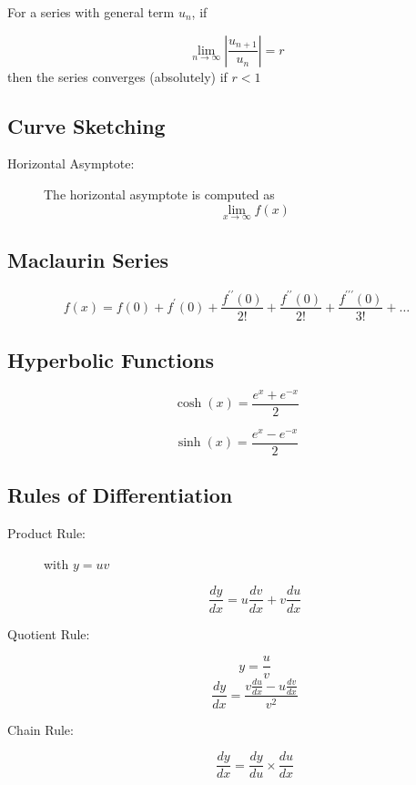 	For a series with general term $u_n$, if
	
	\[ \lim_{n \to \infty } \left| \frac{u_{n+1}}{u_n} \right| = r\]
	then the series converges (absolutely) if $r<1$
	
	
	
\newpage
	\subsection*{Curve Sketching}
	\begin{description}
		\item[Horizontal Asymptote:] The horizontal asymptote is computed as
		\[ \lim_{x \to \infty } f(x) \]
	\end{description}

	
			\subsection*{Maclaurin Series}
			\[f(x) = f(0) + f^{\prime}(0) + \frac{f^{\prime \prime}(0)}{2!} + \frac{f^{\prime \prime}(0)}{2!} + \frac{f^{\prime\prime \prime}(0)}{3!} + \ldots \]
	
	\subsection*{Hyperbolic Functions }
	
	\[ \cosh(x)  =  \frac{e^{x} + e^{-x}}{2} \]
	
	\[ \sinh(x)  = \frac{e^{x} - e^{-x}}{2} \]
	

	\subsection*{Rules of Differentiation}
	\begin{description}
		\item[Product Rule:]  with $y = uv$
		
		
		\[ \frac{dy}{dx} = u \frac{dv}{dx} +  v \frac{du}{dx} \]
		
		\item[Quotient Rule:] \[ y = \frac{u}{v}\]
		\[ \frac{dy}{dx}  = \frac{v \frac{du}{dx} - u \frac{dv}{dx} }{v^2} \]
		
		
		
		\item[Chain Rule:]
		
		\[ \frac{dy}{dx} = \frac{dy}{du} \times \frac{du}{dx}  \]
	\end{description}

